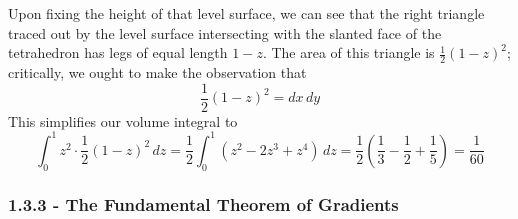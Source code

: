 \documentclass[a4paper]{article}
\begin{document}
Upon fixing the height of that level surface, we can see that the right triangle traced out by the level surface intersecting with the slanted face of the tetrahedron has legs of equal length \( 1 - z \). The area of this triangle is \( \frac{1}{2}\!\left( 1 - z \right)^{2} \); critically, we ought to make the observation that 
\[
	\frac{1}{2}\!\left( 1 - z \right)^{2} = dx \, dy 
\]
This simplifies our volume integral to
\[
	\int^{1}_{0} z^{2} \cdot \frac{1}{2}\!\left( 1 - z \right)^{2} \, dz = \frac{1}{2}\int^{1}_{0} \!\left( z^{2} - 2z^{3} + z^{4} \right) \, dz = \frac{1}{2}\!\left( \frac{1}{3} - \frac{1}{2} + \frac{1}{5} \right) = \frac{1}{60}
\]

\subsubsection{\textsf{1.3.3 - The Fundamental Theorem of Gradients}}
\end{document}
